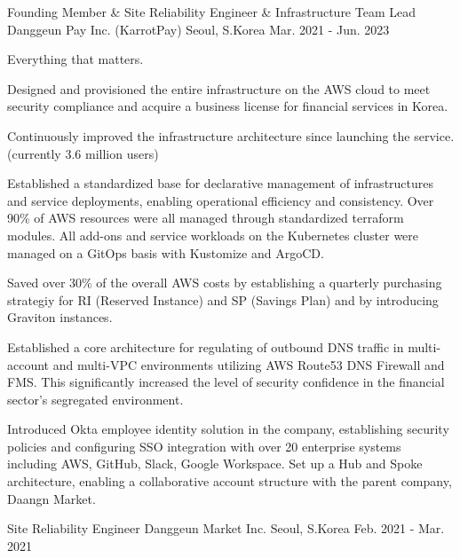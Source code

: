 \begin{cventries}
  \cventry
    {Founding Member \& Site Reliability Engineer \& Infrastructure Team Lead} %
    {Danggeun Pay Inc. (KarrotPay)} %
    {Seoul, S.Korea} %
    {Mar. 2021 - Jun. 2023} %
    {
      \begin{cvitems} %
        \item {Everything that matters.}
        \item {Designed and provisioned the entire infrastructure on the AWS cloud to meet security compliance and acquire a business license for financial services in Korea.}
        \item {Continuously improved the infrastructure architecture since launching the service. (currently 3.6 million users)}
        \item {Established a standardized base for declarative management of infrastructures and service deployments, enabling operational efficiency and consistency. Over 90\% of AWS resources were all managed through standardized terraform modules. All add-ons and service workloads on the Kubernetes cluster were managed on a GitOps basis with Kustomize and ArgoCD.}
        \item {Saved over 30\% of the overall AWS costs by establishing a quarterly purchasing strategiy for RI (Reserved Instance) and SP (Savings Plan) and by introducing Graviton instances.}
        \item {Established a core architecture for regulating of outbound DNS traffic in multi-account and multi-VPC environments utilizing AWS Route53 DNS Firewall and FMS. This significantly increased the level of security confidence in the financial sector's segregated environment.}
        \item {Introduced Okta employee identity solution in the company, establishing security policies and configuring SSO integration with over 20 enterprise systems including AWS, GitHub, Slack, Google Workspace. Set up a Hub and Spoke architecture, enabling a collaborative account structure with the parent company, Daangn Market.}
      \end{cvitems}
    }

  \cventry
    {Site Reliability Engineer} %
    {Danggeun Market Inc.} %
    {Seoul, S.Korea} %
    {Feb. 2021 - Mar. 2021} %
    {
    }


\end{cventries}

